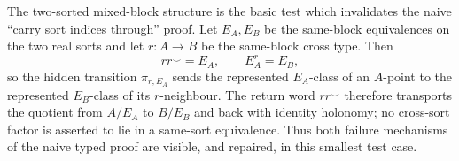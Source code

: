 \begin{remark}
The two-sorted mixed-block structure is the basic test which invalidates the
naive ``carry sort indices through'' proof.  Let \(E_A,E_B\) be the
same-block equivalences on the two real sorts and let \(r:A\to B\) be the
same-block cross type.  Then
\[
 rr^{\smile}=E_A,
 \qquad
 E_A^r=E_B,
\]
so the hidden transition \(\pi_{r,E_A}\) sends the represented
\(E_A\)-class of an \(A\)-point to the represented \(E_B\)-class of its
\(r\)-neighbour.  The return word \(rr^{\smile}\) therefore transports the
quotient from \(A/E_A\) to \(B/E_B\) and back with identity holonomy; no
cross-sort factor is asserted to lie in a same-sort equivalence.  Thus both
failure mechanisms of the naive typed proof are visible, and repaired, in
this smallest test case.
\end{remark}

